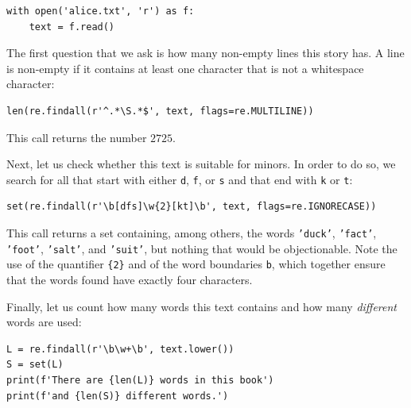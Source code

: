 \begin{verbatim}
with open('alice.txt', 'r') as f:
    text = f.read()
\end{verbatim}

\noindent
The first question that we ask is how many non-empty lines this story has.  A line is non-empty if it contains at
least one character that is not a whitespace character:

\begin{verbatim}
len(re.findall(r'^.*\S.*$', text, flags=re.MULTILINE))
\end{verbatim}

\noindent
This call returns the number $2725$.

Next, let us check whether this text is suitable for minors.  In order to do so, we search for all
 that start with either \texttt{d}, \texttt{f}, or \texttt{s} and that end with
\texttt{k} or \texttt{t}:

\begin{verbatim}
set(re.findall(r'\b[dfs]\w{2}[kt]\b', text, flags=re.IGNORECASE))
\end{verbatim}

\noindent
This call returns a set containing, among others, the words \texttt{'duck'}, \texttt{'fact'},
\texttt{'foot'}, \texttt{'salt'}, and \texttt{'suit'}, but nothing that would be objectionable.  Note the use of
the quantifier \texttt{\{2\}} and of the word boundaries \texttt{b}, which together ensure that the
words found have exactly four characters.

Finally, let us count how many words this text contains and how many \emph{different} words are used:

\begin{verbatim}
L = re.findall(r'\b\w+\b', text.lower())
S = set(L)
print(f'There are {len(L)} words in this book')
print(f'and {len(S)} different words.')
\end{verbatim}

